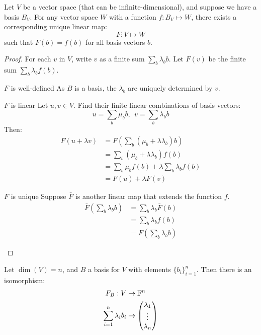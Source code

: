 \documentclass[../Main.tex]{subfiles}
\begin{document}
\begin{proposition}
    Let $V$ be a vector space (that can be infinite-dimensional), and suppose we have a basis $B_V$. For any vector space $W$ with a function $f : B_V \mapsto W$, there exists a corresponding unique linear map:
    \begin{equation*}
        F : V \mapsto W
    \end{equation*}
    such that $F(b) = f(b)$ for all basis vectors $b$.
    \label{propLinMapOfBasis}
\end{proposition}
\begin{proof}
    For each $v$ in $V$, write $v$ as a finite sum $\sum_{b} \lambda_b b$. Let $F(v)$ be the finite sum $\sum_b \lambda_b f(b)$.

    \begin{subproof}{$F$ is well-defined}
        As $B$ is a basis, the $\lambda_b$ are uniquely determined by $v$.
    \end{subproof}
    \begin{subproof}{$F$ is linear}
        Let $u, v \in V$. Find their finite linear combinations of basis vectors:
        \begin{equation*}
            u = \sum_b \mu_b b,~~v = \sum_b \lambda_b b
        \end{equation*}
        Then:
        \begin{align*}
            F(u + \lambda v) &= F\left(\sum_b (\mu_b + \lambda\lambda_b)b\right) \\
            &= \sum_b (\mu_b + \lambda \lambda_b) f(b) \\
            &= \sum_b \mu_b f(b) + \lambda\sum_b\lambda_b f(b) \\
            &= F(u) + \lambda F(v)
        \end{align*}
    \end{subproof}
    \begin{subproof}{$F$ is unique}
        Suppose $\bar{F}$ is another linear map that extends the function $f$.
        \begin{align*}
            \bar{F} \left(\sum_b \lambda_b b\right) &= \sum_b\lambda_b \bar{F}(b) \\
            &= \sum_b \lambda_b f(b) \\
            &= F\left(\sum_b \lambda_b b\right)
        \end{align*}
    \end{subproof}
\end{proof}
\begin{corollary}
    Let $\dim(V) = n$, and $B$ a basis for $V$ with elements $\{b_i\}_{i=1}^n$. Then there is an isomorphism:
    \begin{align*}
        F_B : V &\mapsto \mathbb{F}^n\\
        \sum_{i=1}^n \lambda_i b_i &\mapsto \begin{pmatrix} \lambda_1 \\ \vdots \\ \lambda_n \end{pmatrix}
    \end{align*}
    \label{corCoordinateVector}
\end{corollary}
\end{document}
